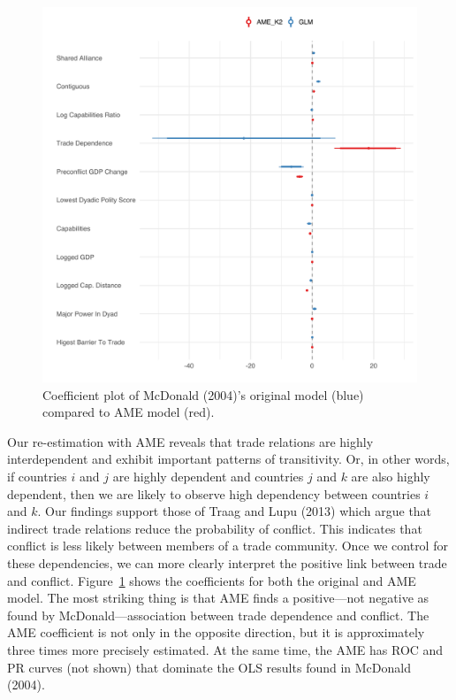\begin{figure}
\includegraphics[width=\textwidth]{McDonald_coefs.pdf}
\caption{\label{fig:mcdCoefs}Coefficient plot of McDonald (2004)'s original model (blue) compared to AME model (red).}
\end{figure}
\FloatBarrier

Our re-estimation with AME reveals that trade relations are highly interdependent and exhibit important patterns of transitivity.  Or, in other words, if countries $i$ and $j$ are highly dependent and countries $j$ and $k$ are also highly dependent, then we are likely to observe high dependency between countries $i$ and $k$. Our findings support those of Traag and Lupu (2013) which argue that indirect trade relations reduce the probability of conflict. This indicates that conflict is less likely between members of a trade community. Once we control for these dependencies, we can more clearly interpret the positive link between trade and conflict. Figure~\ref{fig:mcdCoefs} shows the coefficients for both the original and AME model. The most striking thing is that AME finds a positive---not negative as found by McDonald---association between trade dependence and conflict. The AME coefficient is not only in the opposite direction, but it is approximately three times more precisely estimated.  At the same time, the AME has ROC and PR curves (not shown) that dominate the OLS results found in McDonald (2004).

